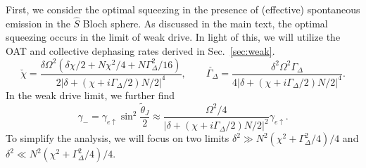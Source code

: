 \documentclass[11pt]{article}
\begin{document}
First, we consider the optimal squeezing in the presence of (effective) spontaneous emission in the $\hat S$ Bloch sphere. As discussed in the main text, the optimal squeezing occurs in the limit of weak drive. In light of this, we will utilize the OAT and collective dephasing rates derived in Sec.~\ref{sec:weak}. 
\begin{equation}
    \check{\chi} = \frac{\delta \Omega^2 (\delta \chi/2 + N \chi^2/4 + N \Gamma_\Delta^2/16)}{2 |\delta + (\chi + i \Gamma_\Delta/2)N/2|^4}, \qquad \check{\Gamma_\Delta} = \frac{\delta^2 \Omega^2 \Gamma_\Delta}{4 |\delta + (\chi + i \Gamma_\Delta/2)N/2|^4}.
\end{equation}
In the weak drive limit, we further find
\begin{equation}
    \gamma_- = \gamma_{e \uparrow} \sin^2 \frac{\tilde{\theta}_J}{2} \approx \frac{\Omega^2/4}{|\delta + (\chi + i \Gamma_\Delta/2)N/2|^2} \gamma_{e \uparrow}.
\end{equation}
To simplify the analysis, we will focus on two limits $\delta^2 \gg N^2 (\chi^2 + \Gamma_\Delta^2/4)/4$ and $\delta^2 \ll N^2 (\chi^2 + \Gamma_\Delta^2/4)/4$.
\end{document}
